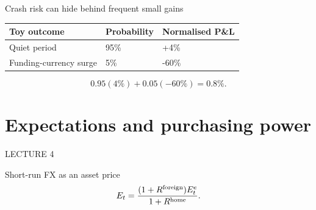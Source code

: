 \documentclass[12pt,aspectratio=169]{beamer}
\begin{document}
\begin{frame}{Crash risk can hide behind frequent small gains}
\begin{center}\begin{tabular}{@{}lll@{}}\toprule \textbf{Toy outcome} & \textbf{Probability} & \textbf{Normalised P\&L}\\\midrule Quiet period & 95\% & +4\%\\[2mm]
Funding-currency surge & 5\% & -60\%\\\bottomrule\end{tabular}\end{center}\[0.95(4\%)+0.05(-60\%)=0.8\%.\]
\end{frame}

\section[Expectations and purchasing power]{Expectations and purchasing power}
\begin{frame}[plain]
{\color{Gold}\large LECTURE 4}\par\vspace{9mm}{\Huge\bfseries Expectations and purchasing power}\par\vspace{7mm}{\Large Why can a rate increase mean appreciation now or weakness over time?}
\end{frame}


\begin{frame}{Short-run FX as an asset price}
\[E_t=\frac{(1+R^{\rm foreign})E_t^e}{1+R^{\rm home}}.\]
\end{frame}

\end{document}
